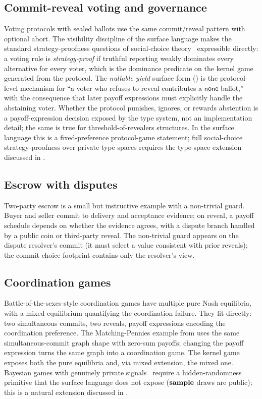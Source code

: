 \subsection{Commit-reveal voting and governance}

Voting protocols with sealed ballots use the same commit/reveal pattern
with optional abort.  The visibility discipline of the surface language
makes the standard strategy-proofness questions of social-choice
theory~\citep{Gibbard1973,Satterthwaite1975} expressible directly: a
voting rule is \emph{strategy-proof} if truthful reporting weakly
dominates every alternative for every voter, which is the
dominance predicate on the kernel game generated from the protocol.  The
\emph{nullable yield} surface form () is
the protocol-level mechanism for ``a voter who refuses to reveal
contributes a $\mathsf{none}$ ballot,'' with the consequence that
later payoff expressions must explicitly handle the abstaining
voter.  Whether the protocol punishes, ignores, or rewards
abstention is a payoff-expression decision exposed by the type
system, not an implementation detail; the same is true for
threshold-of-revealers structures.  In the surface language this is a
fixed-preference protocol-game statement; full social-choice
strategy-proofness over private type spaces requires the type-space
extension discussed in .

\subsection{Escrow with disputes}

Two-party escrow is a small but instructive example with a
non-trivial guard.  Buyer and seller commit to delivery and
acceptance evidence; on reveal, a payoff schedule depends on
whether the evidence agrees, with a dispute branch handled by a
public coin or third-party reveal.  The non-trivial guard appears
on the dispute resolver's commit (it must select a value consistent
with prior reveals); the commit choice footprint contains only the
resolver's view.

\subsection{Coordination games}

Battle-of-the-sexes-style coordination games have multiple pure Nash
equilibria, with a mixed equilibrium quantifying the coordination
failure.  They fit directly: two simultaneous commits, two reveals,
payoff expressions encoding the coordination preference.
The Matching-Pennies example from  uses
the same simultaneous-commit graph shape with zero-sum payoffs; changing
the payoff expression turns the same graph into a coordination game.
The kernel game exposes both the pure equilibria and, via mixed
extension, the mixed one.  Bayesian games with genuinely private
signals~\citep{Harsanyi1967} require a hidden-randomness primitive
that the surface language does not expose ($\mathbf{sample}$
draws are public); this is a natural extension discussed in
.

